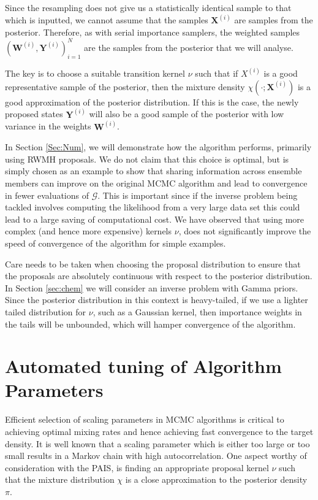 \documentclass[final]{siamltex}
\newcommand{\G}{\mathcal{G}}
\newcommand{\X}{{\mathbf X}}
\newcommand{\Y}{{\mathbf Y}}
\newcommand{\W}{{\mathbf W}}
\begin{document}
Since the resampling does not give us a statistically identical sample
to that which is inputted, we cannot assume that the samples $\X^{(i)}$
are samples from the posterior. Therefore, as with serial
importance samplers, the weighted samples
$(\W^{(i)},\Y^{(i)})_{i=1}^N$ are the samples from the posterior that
we will analyse.

The key is to choose a suitable transition kernel $\nu$ such that
if $X^{(i)}$ is a good representative sample of the posterior,
then the mixture density $\chi(\cdot;\X^{(i)})$ is a good
approximation of the posterior distribution. If this is the case,
the newly proposed states $\Y^{(i)}$ will also be a good sample of the posterior with low variance in the
weights $\W^{(i)}$.

In Section \ref{Sec:Num}, we will demonstrate how the algorithm
performs, primarily using RWMH proposals. We do not claim that this choice is optimal, but
is simply chosen as an example to show that sharing information across
ensemble members can improve on the original MCMC algorithm and lead to
convergence in fewer evaluations of $\G$. This is important since if
the inverse problem being tackled involves computing
the likelihood from a very large data set this could lead to a
large saving of computational cost. We have observed that
using more complex (and hence more expensive) kernels $\nu$, does not
significantly improve the speed of convergence of the algorithm for
simple examples\cite{Paul}.

Care needs to be taken when choosing the proposal distribution to
ensure that the proposals are absolutely continuous with respect to
the posterior distribution. In Section \ref{sec:chem} we will consider
an inverse problem with Gamma priors. Since the posterior distribution
in this context is heavy-tailed, if we use a lighter tailed
distribution for $\nu$, such as a Gaussian kernel, then importance
weights in the tails will be unbounded, which will hamper convergence
of the algorithm.

\section{Automated tuning of Algorithm Parameters}\label{Sec:adapt}

Efficient selection of scaling parameters in MCMC algorithms is
critical to achieving optimal mixing rates and hence achieving fast
convergence to the target density. It is well known that a scaling
parameter which is either too large or too small results in a Markov
chain with high autocorrelation. One aspect worthy of consideration
with the PAIS, is finding an appropriate proposal kernel $\nu$ such
that the mixture distribution $\chi$ is a close approximation to the
posterior density $\pi$.
\end{document}
